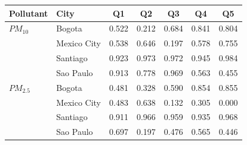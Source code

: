 \begin{tabular}{llccccc}
\toprule
Pollutant & City & Q1 & Q2 & Q3 & Q4 & Q5 \\
\midrule
$PM_{10}$ & Bogota & 0.522 & 0.212 & 0.684 & 0.841 & 0.804 \\
 & Mexico City & 0.538 & 0.646 & 0.197 & 0.578 & 0.755 \\
 & Santiago & 0.923 & 0.973 & 0.972 & 0.945 & 0.984 \\
 & Sao Paulo & 0.913 & 0.778 & 0.969 & 0.563 & 0.455 \\
\addlinespace
$PM_{2.5}$ & Bogota & 0.481 & 0.328 & 0.590 & 0.854 & 0.855 \\
 & Mexico City & 0.483 & 0.638 & 0.132 & 0.305 & 0.000 \\
 & Santiago & 0.911 & 0.966 & 0.959 & 0.935 & 0.968 \\
 & Sao Paulo & 0.697 & 0.197 & 0.476 & 0.565 & 0.446 \\
\bottomrule
\end{tabular}
